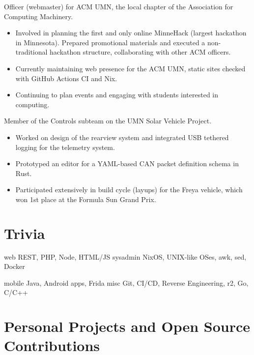 \documentclass{moderncv}
\begin{document}
{
  Officer (webmaster) for ACM UMN, the local chapter of the Association for Computing Machinery.
  \begin{itemize}[label=\rightarrow,noitemsep]
  \item Involved in planning the first and only online MinneHack (largest hackathon in Minnesota). Prepared promotional materials and executed a non-traditional hackathon structure, collaborating with other ACM officers.
  \item Currently maintaining web presence for the ACM UMN, static sites checked with GitHub Actions CI and Nix.
  \item Continuing to plan events and engaging with students interested in computing.
  \end{itemize}
}

{
  Member of the Controls subteam on the UMN Solar Vehicle Project.
  \begin{itemize}[label=\rightarrow,noitemsep]
  \item Worked on design of the rearview system and integrated USB tethered logging for the telemetry system.
  \item Prototyped an editor for a YAML-based CAN packet definition schema in Rust.
  \item Participated extensively in build cycle (layups) for the Freya vehicle, which won 1st place at the Formula Sun Grand Prix.
  \end{itemize}
}

\section{Trivia}

\cvdoubleitem
{web}
{
  REST, PHP, Node, HTML/JS
}
{sysadmin}
{
  NixOS, UNIX-like OSes, awk, sed, Docker
}

\cvdoubleitem
{mobile}
{
  Java, Android apps, Frida
}
{misc}
{
  Git, CI/CD, Reverse Engineering, r2, Go, C/C++
}

\section{Personal Projects and Open Source Contributions}
\end{document}
